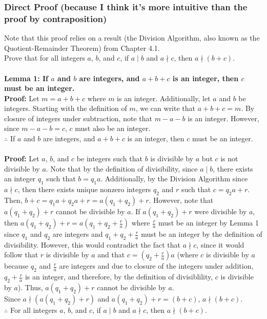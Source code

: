 \documentclass[table]{article}
\begin{document}
\subsubsection{Direct Proof (because I think it's more intuitive than the proof by contraposition)}
Note that this proof relies on a result (the Division Algorithm, also known as the Quotient-Remainder Theorem) from Chapter 4.1.\\
Prove that for all integers $a$, $b$, and $c$, if $a \mid b$ and $a \nmid c$, then $a \nmid (b + c)$.\\~\\
\textbf{Lemma 1: If $a$ and $b$ are integers, and $a+b+c$ is an integer, then $c$ must be an integer.}\\
\textbf{Proof:} Let $m=a+b+c$ where $m$ is an integer. Additionally, let $a$ and $b$ be integers. Starting with the definition of $m$, we can write that $a+b+c=m$. By closure of integers under subtraction, note that $m-a-b$ is an integer. However, since $m-a-b=c$, $c$ must also be an integer.\\
$\therefore$ If $a$ and $b$ are integers, and $a+b+c$ is an integer, then $c$ must be an integer.\\~\\
\textbf{Proof:} Let $a$, $b$, and $c$ be integers such that $b$ is divisible by $a$ but $c$ is not divisible by $a$. Note that by the definition of divisibility, since $a \mid b$, there exists an integer $q_1$ such that $b = q_1a$. Additionally, by the Division Algorithm since $a \nmid c$, then there exists unique nonzero integers $q_2$ and $r$ such that $c = q_2a + r$. Then, $b+c=q_1a+q_2a+r=a(q_1+q_2)+r$. However, note that $a(q_1+q_2)+r$ cannot be divisible by $a$. If $a(q_1+q_2)+r$ were divisible by $a$, then $a(q_1+q_2)+r=a(q_1+q_2+\frac{r}{a})$ where $\frac{r}{a}$ must be an integer by Lemma 1 since $q_1$ and $q_2$ are integers and $q_1+q_2+\frac{r}{a}$ must be an integer by the definition of divisibility. However, this would contradict the fact that $a \nmid c$, since it would follow that $r$ is divisible by $a$ and that $c=(q_2+\frac{r}{a})a$ (where $c$ is divisible by $a$ because $q_2$ and $\frac{r}{a}$ are integers and due to closure of the integers under addition, $q_2+\frac{r}{a}$ is an integer, and therefore, by the definition of divisiblility, $c$ is divisible by $a$). Thus, $a(q_1+q_2)+r$ cannot be divisible by $a$.\\
Since $a \nmid (a(q_1+q_2)+r)$ and $a(q_1+q_2)+r = (b+c)$, $a \nmid (b+c)$.\\
$\therefore$ For all integers $a$, $b$, and $c$, if $a \mid b$ and $a \nmid c$, then $a \nmid (b + c)$.
\end{document}
